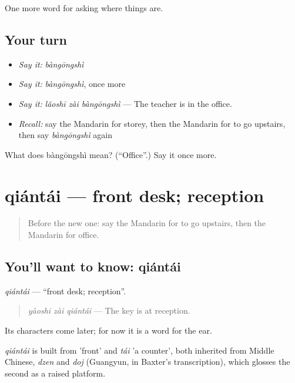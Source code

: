 \begin{grammarlens}[title={What you've built}]
One more word for asking where things are.
\end{grammarlens}

\subsection*{Your turn}
\begin{itemize}
\raggedright
  \item \emph{Say it:} \emph{bàngōngshì}
  \item \emph{Say it:} \emph{bàngōngshì}, once more
  \item \emph{Say it:} \emph{lǎoshī zài bàngōngshì} — The teacher is in the office.
  \item \emph{Recall:} say the Mandarin for storey, then the Mandarin for to go upstairs, then say \emph{bàngōngshì} again
\end{itemize}

\begin{tcolorbox}[breakable,colback=teal!4,colframe=teal!35!black,title={Before you move on}]
What does bàngōngshì mean? (\textquotedblleft{}Office\textquotedblright{}.) Say it once more.
\end{tcolorbox}
\section[qiántái]{qiántái — front desk; reception}

\label{lesson:ZH-C206-qiantai}



\begin{quote}
Before the new one: say the Mandarin for to go upstairs, then the Mandarin for office.
\end{quote}

\subsection*{You'll want to know: qiántái}
\emph{qiántái} — \textquotedblleft{}front desk; reception\textquotedblright{}.

\begin{quote}
\emph{yàoshi zài qiántái} — The key is at reception.
\end{quote}

Its characters come later; for now it is a word for the ear.

\begin{cousinweb}
\emph{qiántái} is built from  'front' and \emph{tái} 'a counter', both inherited from Middle Chinese, \emph{dzen} and \emph{doj} (Guangyun, in Baxter's transcription), which glosses the second as a raised platform.
\end{cousinweb}

